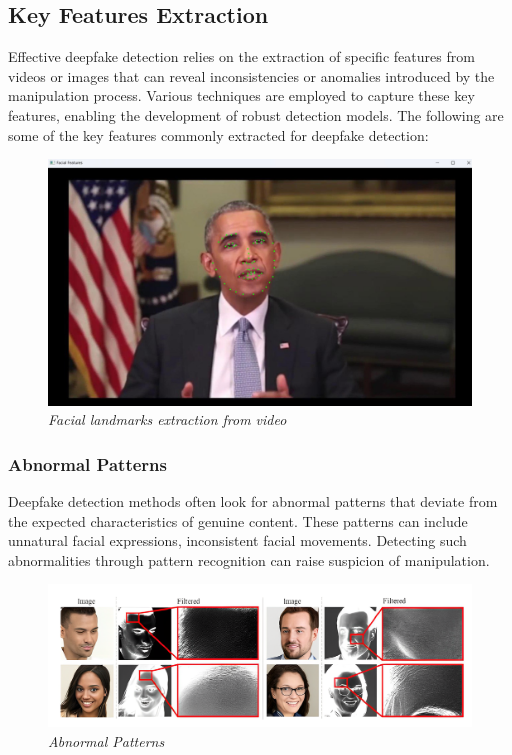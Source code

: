 \subsection{Key Features Extraction}

Effective deepfake detection relies on the extraction of specific features from videos or images that can reveal inconsistencies or anomalies introduced by the manipulation process. Various techniques are employed to capture these key features, enabling the development of robust detection models. The following are some of the key features commonly extracted for deepfake detection:

\begin{figure}[htbp]
    \centering
    \includegraphics[width= 5in ]{img/featureshighlight.jpg}
    \caption{\textit{Facial landmarks extraction from video}}
\end{figure}
\subsubsection{Abnormal Patterns}

Deepfake detection methods often look for abnormal patterns that deviate from the expected characteristics of genuine content. These patterns can include unnatural facial expressions, inconsistent facial movements. Detecting such abnormalities through pattern recognition can raise suspicion of manipulation.
\begin{figure}[htbp]
    \centering
    \includegraphics[width=5in]{img/abnormal_pattern.png}
    \caption{\textit{Abnormal Patterns}}
\end{figure}

